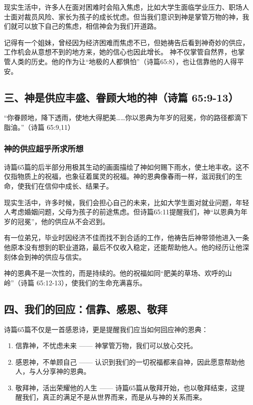 \documentclass[a4paper, 12pt]{article}
\begin{document}
现实生活中，许多人在面对困难时会陷入焦虑，比如大学生面临学业压力、职场人士面对裁员风险、家长为孩子的成长忧虑。但当我们意识到神是掌管万物的神，我们就可以放下自己的焦虑，相信神会为我们开道路。

记得有一个姐妹，曾经因为经济困难而焦虑不已，但她祷告后看到神奇妙的供应，工作机会从意想不到的地方来，她的信心也因此增长。
神不仅掌管自然界，也掌管人类的历史。他的作为让“地极的人都惧怕”（诗篇65:8），也让信靠他的人得平安。
\subsection*{三、神是供应丰盛、眷顾大地的神（诗篇 65:9-13）}
“你眷顾地，降下透雨，使地大得肥美……你以恩典为年岁的冠冕，你的路径都滴下脂油。”（诗篇 65:9,11）
\subsubsection*{神的供应超乎所求所想}
\hspace{0.6cm}诗篇65篇的后半部分用极其生动的画面描绘了神如何赐下雨水，使土地丰收。这不仅指物质上的祝福，也象征着属灵的祝福。神的恩典像春雨一样，滋润我们的生命，使我们在信仰中成长、结果子。

现实生活中，许多时候，我们会担心自己的未来，比如大学生面对就业问题，年轻人考虑婚姻问题，父母为孩子的前途焦虑。但诗篇65:11提醒我们，神“以恩典为年岁的冠冕”，他的供应从不会迟到。

有一位弟兄，毕业时因经济不佳而找不到合适的工作，他祷告后神带领他进入一条他原本没有想到的职业道路，最后不仅收入稳定，还能帮助他人。他的经历让他深刻体会到神的供应与信实。

神的恩典不是一次性的，而是持续的。他的祝福如同“肥美的草场、欢呼的山岭”（诗篇 65:12-13），使我们的生命充满喜乐。
\subsection*{四、我们的回应：信靠、感恩、敬拜}
诗篇65篇不仅是一首感恩诗，更是提醒我们应当如何回应神的恩典：
\begin{enumerate}
    \item 信靠神，不忧虑未来 —— 神掌管万物，我们可以放心交托。

    \item 感恩神，不单顾自己 —— 认识到我们的一切祝福都来自神，因此愿意帮助他人，与人分享神的恩典。

    \item 敬拜神，活出荣耀他的人生 —— 诗篇65篇从敬拜开始，也以敬拜结束，这提醒我们，真正的满足不是从世界而来，而是从与神的关系而来。

\end{enumerate}
\end{document}

